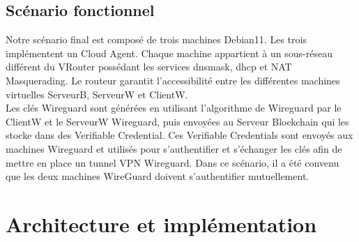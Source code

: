 \documentclass[12pt, openany]{report}
\begin{document}
\subsection{Scénario fonctionnel}
\noindent
\begin{flushleft}
Notre scénario final est composé de trois machines Debian11. Les trois implémentent un Cloud Agent. Chaque machine appartient à un sous-réseau différent du VRouter possédant les services dnsmask, dhcp et NAT Masquerading. Le routeur garantit l'accessibilité entre les différentes machines virtuelles ServeurB, ServeurW et ClientW.\\
Les clés Wireguard sont générées en utilisant l'algorithme de Wireguard par le ClientW et le ServeurW Wireguard, puis envoyées au Serveur Blockchain qui les stocke dans des Verifiable Credential. Ces Verifiable Credentials sont envoyés aux machines Wireguard et utilisés pour s'authentifier et s'échanger les clés afin de mettre en place un tunnel VPN Wireguard. Dans ce scénario, il a été convenu que les deux machines WireGuard doivent s'authentifier mutuellement.
\end{flushleft}

\section{Architecture et implémentation}
\end{document}

